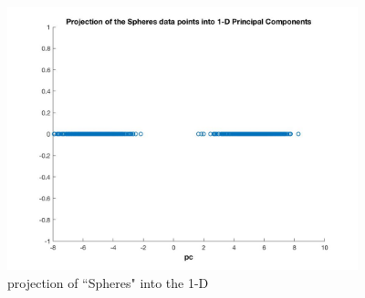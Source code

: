\documentclass[a4paper]{article}
\begin{document}
\begin{spacing}{2.0}
\begin{enumerate}[-]
\begin{figure}[H]
\begin{minipage}[t]{0.5\textwidth}
	      \includegraphics[width=4in]{2_1.jpg}
	      \caption{projection of ``Spheres" into the 1-D}
	      \label{fig:side:b}
	    \end{minipage}
	  \end{figure}
	  

\end{enumerate}
\end{spacing}
\end{document}
